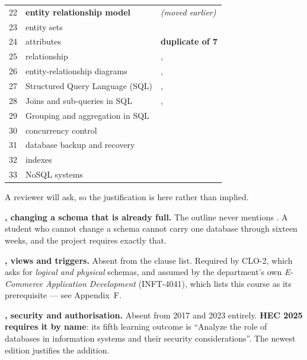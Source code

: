 \begin{longtable}{@{}L{0.9cm}L{9.3cm}L{4.4cm}@{}}
22 & \textbf{entity relationship model} &  \emph{(moved
earlier)} \\
23 & entity sets &  \\
24 & attributes & \textbf{duplicate of 7} \\
25 & relationship & ,  \\
26 & entity-relationship diagrams & ,  \\
27 & Structured Query Language (SQL) & ,  \\
28 & Joins and sub-queries in SQL & ,  \\
29 & Grouping and aggregation in SQL &  \\
30 & concurrency control &  \\
31 & database backup and recovery &  \\
32 & indexes &  \\
33 & NoSQL systems &  \\
\bottomrule
\end{longtable}

\begin{conceptbox}
A reviewer will ask, so the justification is here rather than implied.

\begin{tight}
  \item \textbf{, changing a schema that is already full.}
        The outline never mentions . A student who cannot change
        a schema cannot carry one database through sixteen weeks, and the
        project requires exactly that.
  \item \textbf{, views and triggers.} Absent from the clause
        list. Required by CLO-2, which asks for \emph{logical and physical}
        schemas, and assumed by the department's own
        \emph{E-Commerce Application Development} (INFT-4041), which lists
        this course as its prerequisite --- see Appendix~F.
  \item \textbf{, security and authorisation.} Absent from 2017
        and 2023 entirely. \textbf{HEC 2025 requires it by name}: its fifth
        learning outcome is ``Analyze the role of databases in information
        systems and their security considerations''. The newest edition
        justifies the addition.
\end{tight}
\end{conceptbox}


